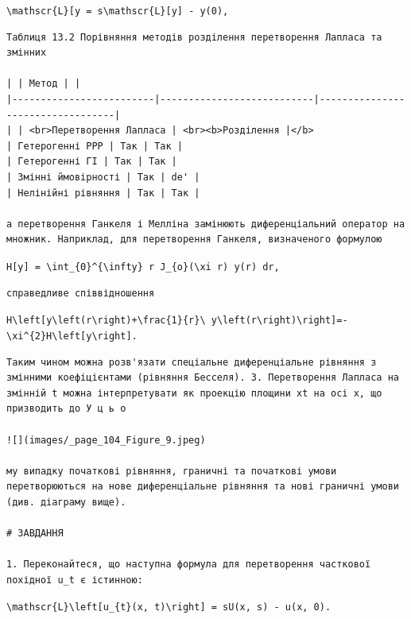 \documentclass[
  ukrainian,
]{article}
\begin{document}
\texttt{\textbackslash{}mathscr\{L\}{[}y\textquotesingle{}{]}\ =\ s\textbackslash{}mathscr\{L\}{[}y{]}\ -\ y(0),}

\begin{verbatim}
Таблиця 13.2 Порівняння методів розділення перетворення Лапласа та змінних

| | Метод | |
|-------------------------|---------------------------|----------------------------------|
| | <br>Перетворення Лапласа | <br><b>Розділення |</b>
| Гетерогенні PPP | Так | Так |
| Гетерогенні ГІ | Так | Так |
| Змінні ймовірності | Так | de' |
| Нелінійні рівняння | Так | Так |

а перетворення Ганкеля і Мелліна замінюють диференціальний оператор на множник. Наприклад, для перетворення Ганкеля, визначеного формулою
\end{verbatim}

\texttt{H{[}y{]}\ =\ \textbackslash{}int\_\{0\}\^{}\{\textbackslash{}infty\}\ r\ J\_\{o\}(\textbackslash{}xi\ r)\ y(r)\ dr,}

\begin{verbatim}
справедливе співвідношення
\end{verbatim}

\texttt{H\textbackslash{}left{[}y\textquotesingle{}\textquotesingle{}\textbackslash{}left(r\textbackslash{}right)+\textbackslash{}frac\{1\}\{r\}\textbackslash{}\ y\textquotesingle{}\textbackslash{}left(r\textbackslash{}right)\textbackslash{}right{]}=-\textbackslash{}xi\^{}\{2\}H\textbackslash{}left{[}y\textbackslash{}right{]}.}

\begin{verbatim}
Таким чином можна розв'язати спеціальне диференціальне рівняння з змінними коефіцієнтами (рівняння Бесселя). 3. Перетворення Лапласа на змінній t можна інтерпретувати як проекцію площини xt на осі x, що призводить до У ц ь о

![](images/_page_104_Figure_9.jpeg)

му випадку початкові рівняння, граничні та початкові умови перетворюються на нове диференціальне рівняння та нові граничні умови (див. діаграму вище).

# ЗАВДАННЯ

1. Переконайтеся, що наступна формула для перетворення часткової похідної u_t є істинною:
\end{verbatim}

\texttt{\textbackslash{}mathscr\{L\}\textbackslash{}left{[}u\_\{t\}(x,\ t)\textbackslash{}right{]}\ =\ sU(x,\ s)\ -\ u(x,\ 0).}
\end{document}
